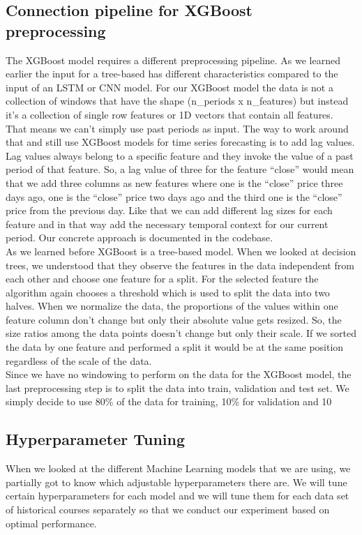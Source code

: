 \documentclass[a4paper,12pt]{report}
\begin{document}
			\subsection{Connection pipeline for XGBoost preprocessing}


The XGBoost model requires a different preprocessing pipeline. As we learned earlier the input for a tree-based has different characteristics compared to the input of an LSTM or CNN model. For our XGBoost model the data is not a collection of windows that have the shape (n\_periods x n\_features) but instead it’s a collection of single row features or 1D vectors that contain all features. That means we can’t simply use past periods as input. The way to work around that and still use XGBoost models for time series forecasting is to add lag values. Lag values always belong to a specific feature and they invoke the value of a past period of that feature. So, a lag value of three for the feature “close” would mean that we add three columns as new features where one is the “close” price three days ago, one is the “close” price two days ago and the third one is the “close” price from the previous day. Like that we can add different lag sizes for each feature and in that way add the necessary temporal context for our current period. Our concrete approach is documented in the codebase.\\
As we learned before XGBoost is a tree-based model. When we looked at decision trees, we understood that they observe the features in the data independent from each other and choose one feature for a split. For the selected feature the algorithm again chooses a threshold which is used to split the data into two halves. When we normalize the data, the proportions of the values within one feature column don’t change but only their absolute value gets resized. So, the size ratios among the data points doesn’t change but only their scale. If we sorted the data by one feature and performed a split it would be at the same position regardless of the scale of the data. \\
Since we have no windowing to perform on the data for the XGBoost model, the last preprocessing step is to split the data into train, validation and test set. We simply decide to use 80\% of the data for training, 10\% for validation and 10%

			\subsection{Hyperparameter Tuning}
When we looked at the different Machine Learning models that we are using, we partially got to know which adjustable hyperparameters there are. We will tune certain hyperparameters for each model and we will tune them for each data set of historical courses separately so that we conduct our experiment based on optimal performance. \\
\end{document}
